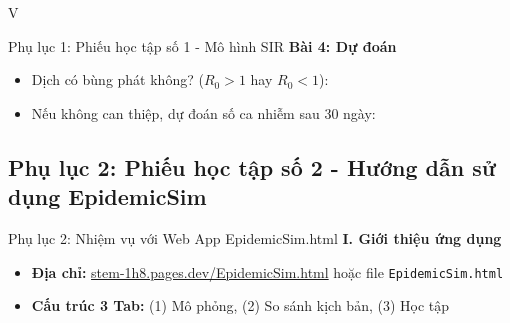 \documentclass[12pt,a4paper]{article}
\begin{document}
\begin{competitionsection}{V}
\begin{phieuhoc_tap_box}{Phụ lục 1: Phiếu học tập số 1 - Mô hình SIR}
\textbf{Bài 4: Dự đoán}
\begin{itemize}[leftmargin=*,noitemsep]
\item Dịch có bùng phát không? ($R_0 > 1$ hay $R_0 < 1$): \underline{\hspace{4cm}}
\item Nếu không can thiệp, dự đoán số ca nhiễm sau 30 ngày: \underline{\hspace{4cm}}
\end{itemize}
\end{phieuhoc_tap_box}

\newpage
\subsection*{Phụ lục 2: Phiếu học tập số 2 - Hướng dẫn sử dụng EpidemicSim}
\begin{phieuhoc_tap_box}{Phụ lục 2: Nhiệm vụ với Web App EpidemicSim.html}
\textbf{I. Giới thiệu ứng dụng}
\begin{itemize}[leftmargin=*,noitemsep]
\item \textbf{Địa chỉ:} \href{https://stem-1h8.pages.dev/EpidemicSim.html}{stem-1h8.pages.dev/EpidemicSim.html} hoặc file \texttt{EpidemicSim.html}
\item \textbf{Cấu trúc 3 Tab:} (1) Mô phỏng, (2) So sánh kịch bản, (3) Học tập
\end{itemize}


\end{phieuhoc_tap_box}
\end{competitionsection}
\end{document}
